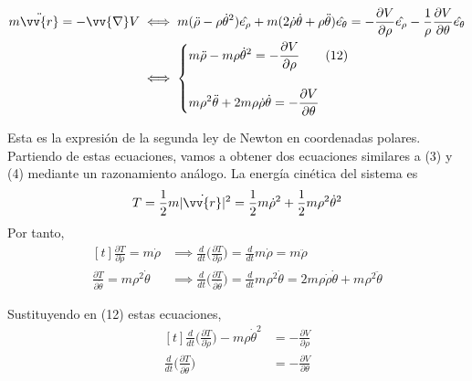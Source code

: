 \documentclass[12pt]{report}
\begin{document}
\begin{align*}
m \ddot{\vv{r}} = -\vv{\nabla}V &\iff m(\ddot{\rho}-\rho\dot{\theta}^2)\hat{e_\rho}+m(2\dot{\rho}\dot{\theta}+\rho\ddot{\theta})\hat{e_\theta} = -\frac{\partial V}{\partial \rho}\hat{e_\rho}-\frac{1}{\rho}\frac{\partial V}{\partial \theta}\hat{e_\theta} \\
&\iff
\begin{cases}
\displaystyle m\ddot{\rho}-m\rho\dot{\theta}^2=-\frac{\partial V}{\partial \rho} \tag{12} \\
\\
\displaystyle m\rho^2\ddot{\theta}+2m\rho\dot{\rho}\dot{\theta} = -\frac{\partial V}{\partial \theta}
\end{cases}
\end{align*}

Esta es la expresión de la segunda ley de Newton en coordenadas polares. Partiendo de estas ecuaciones, vamos a obtener dos ecuaciones similares a (3) y (4) mediante un razonamiento análogo. La energía cinética del sistema es
\[T = \frac{1}{2}m|\dot{\vv{r}}|^2 = \frac{1}{2}m\dot{\rho}^2+\frac{1}{2}m\rho^2\dot{\theta}^2\]
Por tanto,
\[
\begin{aligned}[t]
 \frac{\partial T}{\partial \dot{\rho}} = m\dot{\rho} &\implies \frac{d}{dt}\biggl(\frac{\partial T}{\partial \dot{\rho}}\biggr) = \frac{d}{dt}m\dot{\rho} = m\ddot{\rho} \\
\frac{\partial T}{\partial \dot{\theta}} = m\rho^2\dot{\theta} &\implies \frac{d}{dt}\biggl(\frac{\partial T}{\partial \dot{\theta}}\biggr) = \frac{d}{dt}m\rho^2\dot{\theta} = 2m\rho\dot{\rho}\dot{\theta}+m\rho^2\ddot{\theta}
\end{aligned}
\]

\parindent=0pt
\vspace{2mm}
Sustituyendo en (12) estas ecuaciones, 
\[
\begin{aligned}[t]
\frac{d}{dt}\biggl(\frac{\partial T}{\partial \dot{\rho}}\biggr)-m\rho\dot{\theta}^2 &=-\frac{\partial V}{\partial \rho} \\
\frac{d}{dt}\biggl(\frac{\partial T}{\partial \dot{\theta}}\biggr) &=-\frac{\partial V}{\partial \theta}
\end{aligned}
\]
\end{document}
